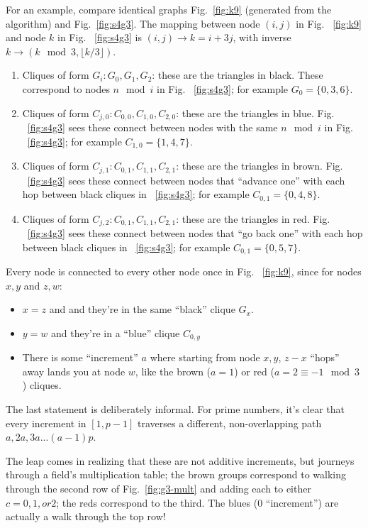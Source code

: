 \documentclass[11pt, oneside]{article} 	%
\begin{document}
For an example, compare identical graphs Fig.~\ref{fig:k9} (generated from the algorithm) and Fig.~\ref{fig:s4g3}. The mapping between node $(i,j)$ in Fig. ~\ref{fig:k9} and node $k$ in Fig. ~\ref{fig:s4g3} is $(i,j) \rightarrow k=i+3j$, with inverse $k \rightarrow (k \mod 3, \lfloor k / 3 \rfloor)$.

\begin{enumerate}
\item Cliques of form $G_i: G_0, G_1, G_2$: these are the triangles in black. These correspond to nodes $n \mod i$ in Fig. ~\ref{fig:s4g3}; for example $G_0 = \{0, 3, 6\}$.
\item Cliques of form $C_{j, 0}: C_{0,0}, C_{1, 0}, C_{2,0}$: these are the triangles in blue. Fig. ~\ref{fig:s4g3} sees these connect between nodes with the same $n \mod i$ in Fig. ~\ref{fig:s4g3}; for example $C_{1,0} = \{1, 4, 7\}$.
\item Cliques of form $C_{j, 1}: C_{0,1}, C_{1, 1}, C_{2,1}$: these are the triangles in brown. Fig. ~\ref{fig:s4g3} sees these connect between nodes that ``advance one'' with each hop between black cliques in ~\ref{fig:s4g3}; for example $C_{0,1} = \{0, 4, 8\}$.
\item Cliques of form $C_{j, 2}: C_{0,1}, C_{1, 1}, C_{2,1}$: these are the triangles in red. Fig. ~\ref{fig:s4g3} sees these connect between nodes that ``go back one'' with each hop between black cliques in ~\ref{fig:s4g3}; for example $C_{0,1} = \{0, 5, 7\}$.
\end{enumerate}


Every node is connected to every other node once in Fig. ~\ref{fig:k9}, since for nodes $x,y$ and $z,w$:
\begin{itemize}
\item $x = z$ and and they're in the same ``black'' clique $G_x$.
\item $y=w$ and they're in a ``blue'' clique $C_{0,y}$
\item There is some ``increment'' $a$ where starting from node $x,y$, $z-x$ ``hops'' away lands you at node $w$, like the brown ($a=1$) or red ($a=2\equiv -1 \mod 3 $) cliques.
\end{itemize}


The last statement is deliberately informal. For prime numbers, it's clear that every increment in $[1, p-1]$ traverses a different, non-overlapping path $a, 2a, 3a ... (a-1)p$.

The leap comes in realizing that these are not additive increments, but journeys through a field's multiplication table; the brown groups correspond to walking through the second row of Fig.~\ref{fig:g3-mult} and adding each to either $c=0, 1, or 2$; the reds correspond to the third. The blues (0 ``increment'') are actually a walk through the top row!
\end{document}
